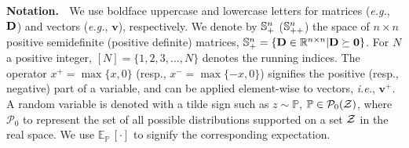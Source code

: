 \documentclass[mnsc, nonblindrev]{informswp}
\newcommand{\1}[1]{\mathds{1}{\left(#1\right)}}
\begin{document}
	\ARTICLEAUTHORS{%
} %

\ABSTRACT{}

\KEYWORDS{}

\maketitle

\noindent\textbf{Notation.} $\;$
We use boldface uppercase and lowercase letters for matrices (\textit{e.g.}, ${\mathbf{D}}$) and vectors (\textit{e.g.}, $\bm v$), respectively. We denote by $\mathbb{S}_+^n$ ($\mathbb{S}_{++}^n$) the space of $n \times n$ positive semidefinite (positive definite) matrices, \ie $\mathbb{S}_+^n = \{ {\mathbf{D}} \in \mathbb{R}^{n \times n} | {\mathbf{D}} \succeq \bm 0 \}$. For $N$ a positive integer, $[N] = \{1,2,3,\ldots,N\}$ denotes the running indices. The operator $x^+ = \max\{x, 0\}$ (resp., $x^- = \max\{-x, 0\}$) signifies the positive (resp., negative) part of a variable, and can be applied element-wise to vectors, \textit{i.e.}, $\bm{v}^+$. A random variable is denoted with a tilde sign such as ${z} \sim \mathbb{P}$, $\mathbb{P} \in \mathcal{P}_0(\mathcal{Z})$, where $\mathcal{P}_0$ to represent the set of all possible distributions supported on a set $\mathcal{Z}$ in the real space. We use $\mathbb{E}_{\mathbb{P}}\,[\cdot]$ to signify the corresponding expectation.

\end{document}

